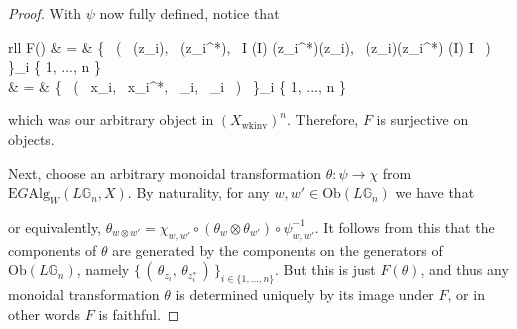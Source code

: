 \documentclass{amsart} %
\newenvironment{eq*}{\begin{equation*}}{\end{equation*}}
\begin{document}
\begin{proof}
With $\psi$ now fully defined, notice that
\begin{eq*} \begin{array}{rll}
		F(\psi) & = & \big\{ \, ( \, \psi(z_i), \, \psi(z_i^*), \, I \xrightarrow{\sim} \psi(I) \xrightarrow{\sim} \psi(z_i^*)\psi(z_i), \, \psi(z_i)\psi(z_i^*) \xrightarrow{\sim} \psi(I) \xrightarrow{\sim} I \, ) \, \big\}_{i \in \{ 1, ..., n \} } \\
		& = & \big\{ \, ( \, x_i, \, x_i^*, \, \eta_i, \, \epsilon_i \, ) \, \big\}_{i \in \{ 1, ..., n \} } \\
		\end{array}
\end{eq*}
which was our arbitrary object in $(X_{\mathrm{wkinv}})^n$. Therefore, $F$ is surjective on objects.

Next, choose an arbitrary monoidal transformation $\theta : \psi \to \chi$ from $\mathrm{E}G\mathrm{Alg}_W(L\mathbb{G}_n, X)$. By naturality, for any $w, w' \in \mathrm{Ob}(L\mathbb{G}_n)$ we have that
\begin{eq*} 
\end{eq*}
or equivalently, $\theta_{w \otimes w'} = \chi_{w, w'} \circ (\theta_w \otimes \theta_{w'}) \circ \psi_{w, w'}^{-1}$. It follows from this that the components of $\theta$ are generated by the components on the generators of $\mathrm{Ob}(L\mathbb{G}_n)$, namely $\{ \, ( \, \theta_{z_i}, \, \theta_{z_i^*} \, ) \, \}_{i \in \{ 1, ..., n \} }$. But this is just $F(\theta)$, and thus any monoidal transformation $\theta$ is determined uniquely by its image under $F$, or in other words $F$ is faithful.


\end{proof}
\end{document}
